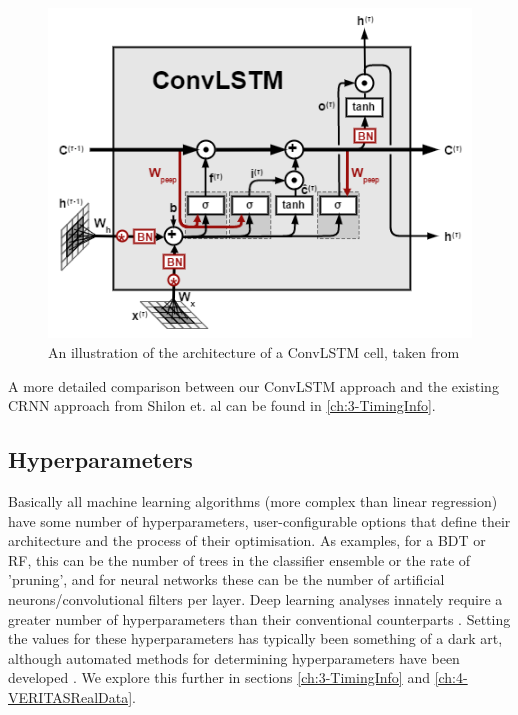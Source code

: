 \begin{figure}[ht] 
        \centering \includegraphics[width=0.5\columnwidth]{figures/convlstmcell.png}
        \caption{
                \label{fig:convlstmcell} %
                An illustration of the architecture of a ConvLSTM cell, taken from \cite{convlstmintro}
        }
\end{figure}
A more detailed comparison between our ConvLSTM approach and the existing CRNN approach from Shilon et. al \cite{Shilon} can be found in \ref{ch:3-TimingInfo}.


\subsection{Hyperparameters}
Basically all machine learning algorithms (more complex than linear regression) have some number of hyperparameters, user-configurable options that define their architecture and the process of their optimisation. As examples, for a BDT or RF, this can be the number of trees in the classifier ensemble or the rate of 'pruning', and for neural networks these can be the number of artificial neurons/convolutional filters per layer. Deep learning analyses innately require a greater number of hyperparameters than their conventional counterparts \cite{hyperopt}. Setting the values for these hyperparameters has typically been something of a dark art, although automated methods for determining hyperparameters have been developed \cite{hyperopt}. We explore this further in sections \ref{ch:3-TimingInfo} and \ref{ch:4-VERITASRealData}.

